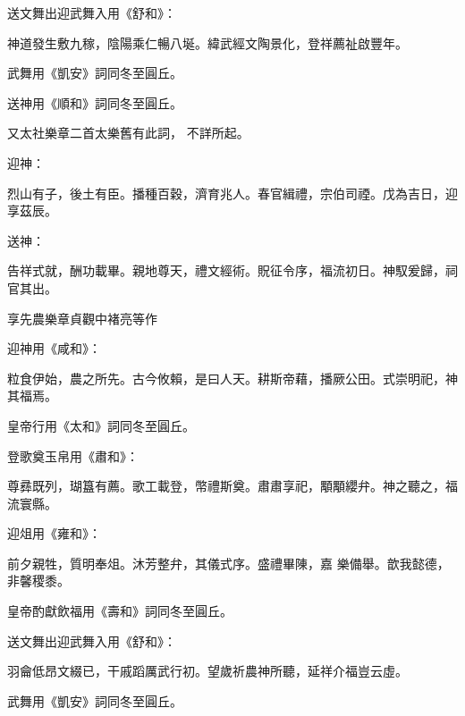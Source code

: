 \begin{pinyinscope}
 送文舞出迎武舞入用《舒和》：



 神道發生敷九稼，陰陽乘仁暢八埏。緯武經文陶景化，登祥薦祉啟豐年。



 武舞用《凱安》詞同冬至圓丘。



 送神用《順和》詞同冬至圓丘。



 又太社樂章二首太樂舊有此詞，
 不詳所起。



 迎神：



 烈山有子，後土有臣。播種百穀，濟育兆人。春官緝禮，宗伯司禋。戊為吉日，迎享茲辰。



 送神：



 告祥式就，酬功載畢。親地尊天，禮文經術。貺征令序，福流初日。神馭爰歸，祠官其出。



 享先農樂章貞觀中褚亮等作



 迎神用《咸和》：



 粒食伊始，農之所先。古今攸賴，是曰人天。耕斯帝藉，播厥公田。式崇明祀，神其福焉。



 皇帝行用《太和》詞同冬至圓丘。



 登歌奠玉帛用《肅和》：



 尊彞既列，瑚簋有薦。歌工載登，幣禮斯奠。肅肅享祀，顒顒纓弁。神之聽之，福流寰縣。



 迎俎用《雍和》：



 前夕親牲，質明奉俎。沐芳整弁，其儀式序。盛禮畢陳，嘉
 樂備舉。歆我懿德，非馨稷黍。



 皇帝酌獻飲福用《壽和》詞同冬至圓丘。



 送文舞出迎武舞入用《舒和》：



 羽龠低昂文綴已，干戚蹈厲武行初。望歲祈農神所聽，延祥介福豈云虛。



 武舞用《凱安》詞同冬至圓丘。




\end{pinyinscope}
